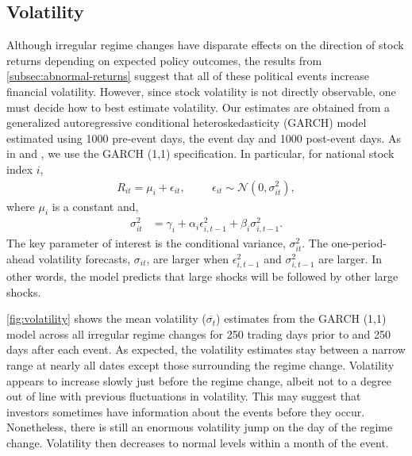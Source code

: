\documentclass[12pt,final,fleqn]{article}
\theoremstyle{plain}
\begin{document}
\subsection{Volatility} \label{subsec: Volatility}
Although irregular regime changes have disparate effects on the direction of stock returns depending on expected policy outcomes, the results from \autoref{subsec:abnormal-returns} suggest that all of these political events increase financial volatility. However, since stock volatility is not directly observable, one must decide how to best estimate volatility. Our estimates are obtained from a generalized autoregressive conditional heteroskedasticity (GARCH) model estimated using 1000 pre-event days, the event day and 1000 post-event days. As in \citet{jensen2005market} and \citet{leblang2005government}, we use the GARCH (1,1) specification. In particular, for national stock index $i$,
\begin{align*}
R_{it}=\mu_i + \epsilon_{it},\hspace{1cm} \epsilon_{it}\sim \mathcal{N}\left(0,\sigma_{it}^2\right),
\end{align*}
where $\mu_i$ is a constant and,
\begin{align*}
\sigma_{it}^2&=\gamma_{i}+\alpha_{i}\epsilon_{i,t-1}^2+\beta_{i}\sigma_{i,t-1}^2.
\end{align*}
The key parameter of interest is the conditional variance, $\sigma_{it}^2$. The one-period-ahead volatility forecasts, $\sigma_{it}$, are larger when $\epsilon_{i,t-1}^2$ and $\sigma_{i,t-1}^2$ are larger. In other words, the model predicts that large shocks will be followed by other large shocks.

\autoref{fig:volatility} shows the mean volatility ($\overline{\sigma_t}$) estimates from the GARCH (1,1) model across all irregular regime changes for 250 trading days prior to and 250 days after each event. As expected, the volatility estimates stay between a narrow range at nearly all dates except those surrounding the regime change. Volatility appears to increase slowly just before the regime change, albeit not to a degree out of line with previous fluctuations in volatility. This may suggest that investors sometimes have information about the events before they occur. Nonetheless, there is still an enormous volatility jump on the day of the regime change. Volatility then decreases to normal levels within a month of the event.
\end{document}
